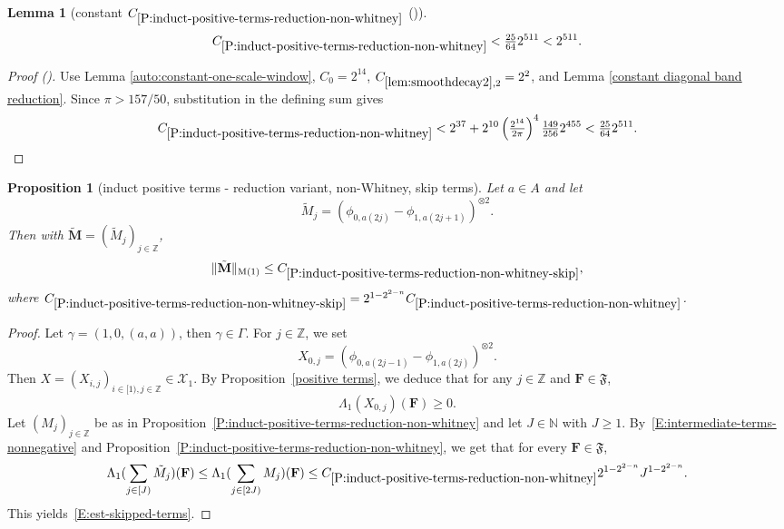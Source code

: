 \documentclass[12pt,reqno]{amsart}
\newcommand{\auto}{{({\tiny\faCar})}}
\theoremstyle{plain}
\newtheorem{lemma}[theorem]{Lemma}
\newtheorem{proposition}[theorem]{Proposition}
\numberwithin{equation}{section}
\theoremstyle{remark}
\newcommand{\using}[1]{}
\newcommand{\Z}{{\mathbb Z}}
\newcommand{\N}{{\mathbb N}}
\newcommand{\M}{\mathbf{M}}
\begin{document}
\begin{lemma}[constant $C_{\ref{P:induct-positive-terms-reduction-non-whitney}}$ \auto]\label{constant non Whitney reduction}\using{auto:constant-one-scale-window}\using{lem:smoothdecay2}\using{P:diagonal-band-reduction}\using{constant diagonal band reduction}\using{P:induct-positive-terms-reduction-non-whitney}
\begin{equation}\label{constant non Whitney reduction bound}
C_{\ref{P:induct-positive-terms-reduction-non-whitney}}
<\tfrac{25}{64}2^{511}<2^{511}.
\end{equation}
\end{lemma}
\begin{proof}[Proof \auto]
Use Lemma \ref{auto:constant-one-scale-window}, $C_0=2^{14}$, $C_{\ref{lem:smoothdecay2},2}=2^2$, and Lemma \ref{constant diagonal band reduction}. Since $\pi>157/50$, substitution in the defining sum gives
\[
C_{\ref{P:induct-positive-terms-reduction-non-whitney}}
<2^{37}
+2^{10}\left(\tfrac{2^{14}}{2\pi}\right)^4
\tfrac{149}{256}2^{455}
<\tfrac{25}{64}2^{511}.
\]
\end{proof}


\begin{proposition}[induct positive terms - reduction variant, non-Whitney, skip terms]
\label{P:induct-positive-terms-reduction-non-whitney-skip}\using{positive terms}\using{P:induct-positive-terms-reduction-non-whitney}
Let $a\in A$ and let
\begin{equation}\label{auto:skipped-non-Whitney-kernel}\tilde{M}_j=({\phi}_{0,a(2j)}-{\phi}_{1,a(2j+1)})^{\otimes 2}.\end{equation}
Then with $\tilde{\M}=(\tilde{M}_j)_{j\in \Z}$,
\begin{equation}\label{E:est-skipped-terms}
\|\tilde{\M}\|_{\rm M(1)}\le C_{\ref{P:induct-positive-terms-reduction-non-whitney-skip}},
\end{equation}
where $C_{\ref{P:induct-positive-terms-reduction-non-whitney-skip}}= 2^{1-2^{2-n}} C_{\ref{P:induct-positive-terms-reduction-non-whitney}}$.
\end{proposition}


\begin{proof}
Let $\gamma=(1,0,(a,a))$, then $\gamma \in \Gamma$. For $j\in \Z$, we set
\[
X_{0,j}=({\phi}_{0,a(2j-1)}-{\phi}_{1,a(2j)})^{\otimes 2}.
\]
Then $X=(X_{i,j})_{i\in [1),j\in \Z} \in \mathcal X_1$. By Proposition~\ref{positive terms}, we deduce that for any $j\in \Z$ and $\mathbf{F} \in \mathfrak{F}$,
\begin{equation}\label{E:intermediate-terms-nonnegative}
\Lambda_1(X_{0,j})(\mathbf{F}) \geq 0.
\end{equation}
Let $(M_j)_{j\in \Z}$ be as in Proposition~\ref{P:induct-positive-terms-reduction-non-whitney} and let $J\in\N$ with $J\ge1$. By~\eqref{E:intermediate-terms-nonnegative} and Proposition~\ref{P:induct-positive-terms-reduction-non-whitney}, we get that for every $\mathbf{F} \in \mathfrak{F}$,
\[
\Lambda_1(\sum_{j\in [J)} \tilde{M}_j)(\mathbf{F})
\leq \Lambda_1(\sum_{j\in [2J)} M_j)(\mathbf{F})
\leq C_{\ref{P:induct-positive-terms-reduction-non-whitney}} 2^{1-2^{2-n}} J^{1-2^{2-n}}.
\]
This yields~\eqref{E:est-skipped-terms}.
\end{proof}
\end{document}
